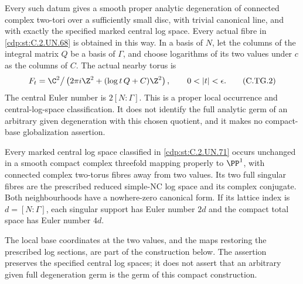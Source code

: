 \begin{proposition}
Every such datum gives a smooth proper analytic
degeneration of connected complex two-tori over a
sufficiently small disc, with trivial canonical line,
and with exactly the specified marked central log space.
Every actual fibre in \ref{cdp:st:C.2.UN.68} is obtained in this way.
In a basis of $N$, let the columns of the integral
matrix $Q$ be a basis of $\Gamma$, and choose logarithms
of its two values under $c$ as the columns of $C$.
The actual nearby torus is
\[
 F_t=\C^2\big/
       \left(2\pi i\Z^2+(\log t\,Q+C)\Z^2\right),
       \qquad 0<|t|<\epsilon .
\tag{C.TG.2}\label{cdp:eq:C.TG.2}
\]
The central Euler number is $2[N:\Gamma]$.
This is a proper local occurrence and central-log-space
classification. It does not identify the full analytic
germ of an arbitrary given degeneration with this
chosen quotient, and it makes no compact-base
globalization assertion.
\end{proposition}

\begin{proposition}\label{cdp:st:C.2.UN.73}

Every marked central log space classified in \ref{cdp:st:C.2.UN.71} occurs
unchanged in a smooth compact complex threefold mapping
properly to $\PP^1$, with connected complex two-torus
fibres away from two values. Its two full singular fibres
are the prescribed reduced simple-NC log space and its
complex conjugate. Both neighbourhoods have a nowhere-zero
canonical form. If its lattice index is $d=[N:\Gamma]$,
each singular support has Euler number $2d$ and the
compact total space has Euler number $4d$.

The local base coordinates at the two values, and the
maps restoring the prescribed log sections, are part
of the construction below. The assertion preserves
the specified central log spaces; it does not assert
that an arbitrary given full degeneration germ is
the germ of this compact construction.
\end{proposition}

